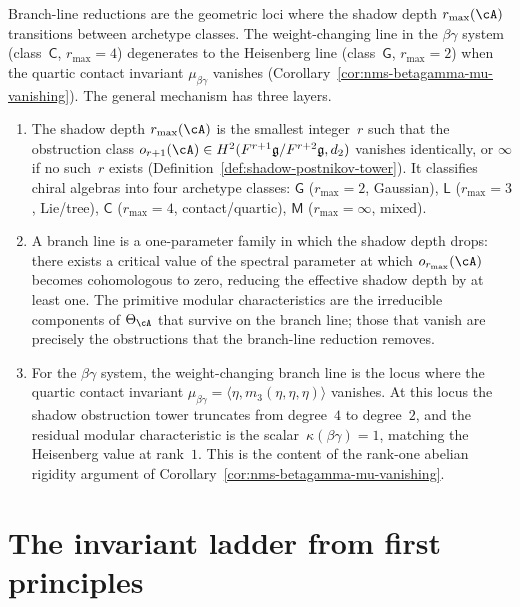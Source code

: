 \begin{construction}
\label{constr:branch-line-shadow-depth}
Branch-line reductions are the geometric loci where the shadow
depth $r_{\max}(\cA)$ transitions between archetype classes.
The weight-changing line in the $\beta\gamma$ system
(class~$\mathsf{C}$, $r_{\max} = 4$) degenerates to the
Heisenberg line (class~$\mathsf{G}$, $r_{\max} = 2$) when
the quartic contact invariant $\mu_{\beta\gamma}$ vanishes
(Corollary~\ref{cor:nms-betagamma-mu-vanishing}).
The general mechanism has three layers.
\begin{enumerate}[label=\textup{(\roman*)}]
\item The shadow depth $r_{\max}(\cA)$ is the smallest
 integer~$r$ such that the obstruction class
 $o_{r+1}(\cA) \in H^2(F^{r+1}\mathfrak{g}/F^{r+2}\mathfrak{g}, d_2)$
 vanishes identically, or $\infty$ if no such~$r$ exists
 (Definition~\ref{def:shadow-postnikov-tower}).
 It classifies chiral algebras into four archetype
 classes: $\mathsf{G}$ ($r_{\max} = 2$, Gaussian),
 $\mathsf{L}$ ($r_{\max} = 3$, Lie/tree),
 $\mathsf{C}$ ($r_{\max} = 4$, contact/quartic),
 $\mathsf{M}$ ($r_{\max} = \infty$, mixed).
\item A branch line is a one-parameter family in which the
 shadow depth drops: there exists a critical value of the
 spectral parameter at which $o_{r_{\max}}(\cA)$
 becomes cohomologous to zero, reducing the effective
 shadow depth by at least one. The primitive modular
 characteristics are the irreducible components of
 $\Theta_\cA$ that survive on the branch line; those
 that vanish are precisely the obstructions that the
 branch-line reduction removes.
\item For the $\beta\gamma$ system, the
 weight-changing branch line is the locus where the
 quartic contact invariant
 $\mu_{\beta\gamma}
 = \langle \eta, m_3(\eta,\eta,\eta)\rangle$
 vanishes. At this locus the shadow obstruction tower truncates from
 degree~$4$ to degree~$2$, and the residual modular
 characteristic is the scalar~$\kappa(\beta\gamma)
 = 1$, matching the Heisenberg value at rank~$1$.
 This is the content of the rank-one abelian rigidity
 argument of Corollary~\ref{cor:nms-betagamma-mu-vanishing}.
\end{enumerate}
\end{construction}

\section{The invariant ladder from first principles}
\label{sec:blr-invariant-ladder}

